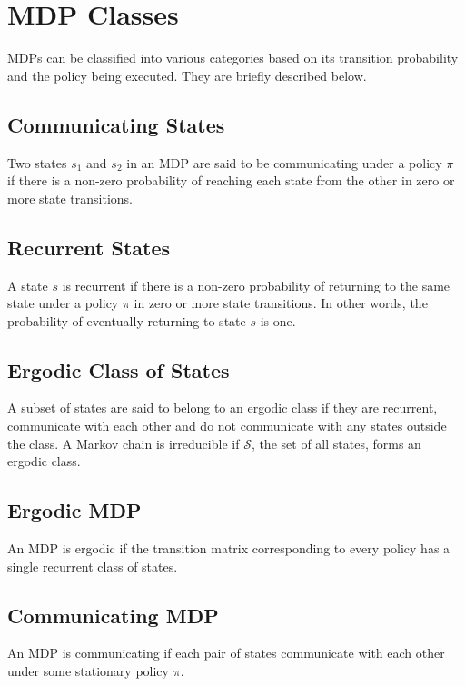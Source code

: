 \section{MDP Classes}

MDPs can be classified into various categories based on its transition probability and the policy being executed. They are briefly described below.

\subsection{Communicating States}

Two states $s_1$ and $s_2$ in an MDP are said to be communicating under a policy $\pi$ if there is a non-zero probability of reaching each state from the other in zero or more state transitions.

\subsection{Recurrent States}

A state $s$ is recurrent if there is a non-zero probability of returning to the same state under a policy $\pi$ in zero or more state transitions.
In other words, the probability of eventually returning to state $s$ is one.

\subsection{Ergodic Class of States}

A subset of states are said to belong to an ergodic class if they are recurrent, communicate with each other and do not communicate with any states outside the class.
A Markov chain is irreducible if $\mathcal{S}$, the set of all states, forms an ergodic class.

\subsection{Ergodic MDP}

An MDP is ergodic if the transition matrix corresponding to every policy has a single recurrent class of states.

\subsection{Communicating MDP}

An MDP is communicating if each pair of states communicate with each other under some stationary policy $\pi$.

